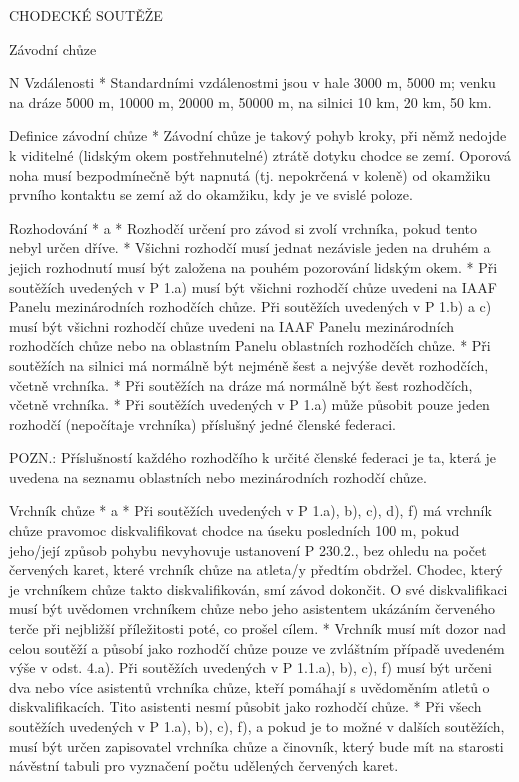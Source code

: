\sec CHODECKÉ SOUTĚŽE


\secc Závodní chůze

\begitems \style N
Vzdálenosti
* Standardními vzdálenostmi jsou v hale 3000 m, 5000 m; venku na dráze 5000 m, 10000 m, 20000 m, 50000 m, na silnici 10 km, 20 km, 50 km.

Definice závodní chůze
* Závodní chůze je takový pohyb kroky, při němž nedojde k viditelné (lidským okem postřehnutelné) ztrátě dotyku chodce se zemí. Oporová noha musí bezpodmínečně být napnutá (tj. nepokrčená v koleně) od okamžiku prvního kontaktu se zemí až do okamžiku, kdy je ve svislé poloze.

Rozhodování
* \begitems \style a
  * Rozhodčí určení pro závod si zvolí vrchníka, pokud tento nebyl určen dříve.
  * Všichni rozhodčí musí jednat nezávisle jeden na druhém a jejich rozhodnutí musí být založena na pouhém pozorování lidským okem.
  * Při soutěžích uvedených v P 1.a) musí být všichni rozhodčí chůze uvedeni na IAAF Panelu mezinárodních rozhodčích chůze. Při soutěžích uvedených v P 1.b) a c) musí být všichni rozhodčí chůze uvedeni na IAAF Panelu mezinárodních rozhodčích chůze nebo na oblastním Panelu oblastních rozhodčích chůze.
  * Při soutěžích na silnici má normálně být nejméně šest a nejvýše devět rozhodčích, včetně vrchníka.
  * Při soutěžích na dráze má normálně být šest rozhodčích, včetně vrchníka.
  * Při soutěžích uvedených v P 1.a) může působit pouze jeden rozhodčí (nepočítaje vrchníka) příslušný jedné členské federaci.
  \enditems

  POZN.: Příslušností každého rozhodčího k určité členské federaci je ta, která je uvedena na seznamu oblastních nebo mezinárodních rozhodčí chůze.

Vrchník chůze
* \begitems \style a
  * Při soutěžích uvedených v P 1.a), b), c), d), f) má vrchník chůze pravomoc diskvalifikovat chodce na úseku posledních 100 m, pokud jeho/její způsob pohybu nevyhovuje ustanovení P 230.2., bez ohledu na počet červených karet, které vrchník chůze na atleta/y předtím obdržel. Chodec, který je vrchníkem chůze takto diskvalifikován, smí závod dokončit. O své diskvalifikaci musí být uvědomen vrchníkem chůze nebo jeho asistentem ukázáním červeného terče při nejbližší příležitosti poté, co prošel cílem.
  * Vrchník musí mít dozor nad celou soutěží a působí jako rozhodčí chůze pouze ve zvláštním případě uvedeném výše v odst. 4.a). Při soutěžích uvedených v P 1.1.a), b), c), f) musí být určeni dva nebo více asistentů vrchníka chůze, kteří pomáhají s uvědoměním atletů o diskvalifikacích. Tito asistenti nesmí působit jako rozhodčí chůze.
  * Při všech soutěžích uvedených v P 1.a), b), c), f), a pokud je to možné v dalších soutěžích, musí být určen zapisovatel vrchníka chůze a činovník, který bude mít na starosti návěstní tabuli pro vyznačení počtu udělených červených karet.
  \enditems

